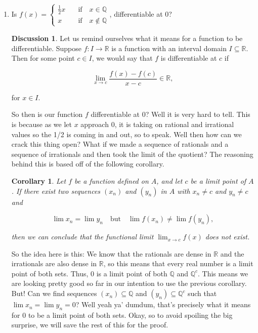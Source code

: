 \documentclass{article}
\newtheorem{corollary}{Corollary}[theorem]
\theoremstyle{definition}
\theoremstyle{remark}
\theoremstyle{definition}
\newtheorem*{discussion}{Discussion}
\begin{document}
\begin{enumerate}[leftmargin=*]
    \item Is $f(x)=\begin{cases} \frac{1}{2}x &\quad\text{if}\quad x\in\mathbb{Q} \\ x &\quad\text{if}\quad x\notin\mathbb{Q} \end{cases}$, differentiable at 0?


\begin{discussion}
    Let us remind ourselves what it means for a function to be differentiable. Suppose $f\colon I\rightarrow\mathbb{R}$ is a function with an interval domain $I\subseteq\mathbb{R}$. Then for some point $c\in I$, we would say that $f$ is differentiable at $c$ if 
    
    \begin{equation*}
        \lim_{x\rightarrow c}\frac{f(x)-f(c)}{x-c}\in\mathbb{R},
    \end{equation*}
    
    \noindent for $x\in I$.\par 
    
    So then is our function $f$ differentiable at 0? Well it is very hard to tell. This is because as we let $x$ approach 0, it is taking on rational and irrational values so the 1/2 is coming in and out, so to speak. Well then how can we crack this thing open? What if we made a sequence of rationals and a sequence of irrationals and then took the limit of the quotient? The reasoning behind this is based off of the following corollary.
    
    \begin{corollary}
        Let $f$ be a function defined on $A$, and let $c$ be a limit point of $A$. If there exist two sequences $(x_n)$ and $(y_n)$ in $A$ with $x_n\neq c$ and $y_n\neq c$ and 
        
        \begin{equation*}
            \lim x_n=\lim y_n\quad\text{but}\quad\lim f(x_n)\neq\lim f(y_n),
        \end{equation*}
        
        \noindent then we can conclude that the functional limit $\lim_{x\rightarrow c} f(x)$ does not exist.
    \end{corollary}
    
    \newpage
    
    \noindent So the idea here is this: We know that the rationals are dense in $\mathbb{R}$ and the irrationals are also dense in $\mathbb{R}$, so this means that every real number is a limit point of both sets. Thus, 0 is a limit point of both $\mathbb{Q}$ and $\mathbb{Q}^c$. This means we are looking pretty good so far in our intention to use the previous corollary. But! Can we find sequences $(x_n)\subseteq\mathbb{Q}$ and $(y_n)\subseteq\mathbb{Q}^c$ such that $\lim x_n=\lim y_n=0$? Well yeah ya' dumdum, that's precisely what it means for 0 to be a limit point of both sets. Okay, so to avoid spoiling the big surprise, we will save the rest of this for the proof. 
    

\end{discussion}
\end{enumerate}
\end{document}

